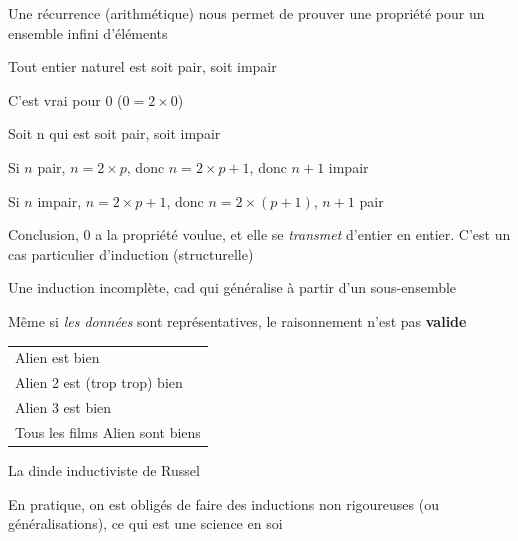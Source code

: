 \begin{frame}
	Une récurrence (arithmétique) nous permet de prouver une propriété pour un ensemble infini d'éléments\pause \newline
	
		\begin{description}[labelindent=6pt,style=multiline,leftmargin=1.3in]
		 \setlength\itemsep{1em}
		 \item[Exemple] Tout entier naturel est soit pair, soit impair\pause
		 \item[Initialisation] C'est vrai pour $0$ ($0 = 2 \times 0$)\pause
		 \item[Hérédité] Soit n qui est soit pair, soit impair\pause  	\end{description}
	
		 Si $n$ pair, $n = 2 \times p$, donc $n = 2 \times p + 1$, donc $n+1$ impair\pause\newline
		 
Si $n$ impair, $n = 2 \times p + 1$, donc $n = 2 \times (p + 1)$, $n+1$ pair\pause\newline

		 Conclusion, 0 a la propriété voulue, et elle se \textit{transmet} d'entier en entier. \pause C'est un cas particulier d'induction (structurelle)


\end{frame}




\begin{frame}
	
		\begin{description}[labelindent=6pt,style=multiline,leftmargin=1.3in]
		 \setlength\itemsep{1em}
		 \item[En gros] Une induction incomplète, cad qui généralise à partir d'un sous-ensemble \pause
		 \item[Remarque] Même si \textit{les données} sont représentatives, le raisonnement n'est pas \textbf{valide}\pause
		 \item[Exemple]
		  \begin{tabular}[t]{l}
Alien est bien\\
Alien 2 est (trop trop) bien\\
Alien 3 est bien\\
\hline
Tous les films Alien sont biens\\
\end{tabular}\pause
		 \item[Exemple bis] La dinde inductiviste de Russel\pause
  	\end{description}
  	En pratique, on est obligés de faire des inductions non rigoureuses (ou généralisations), ce qui est une science en soi
\end{frame}


